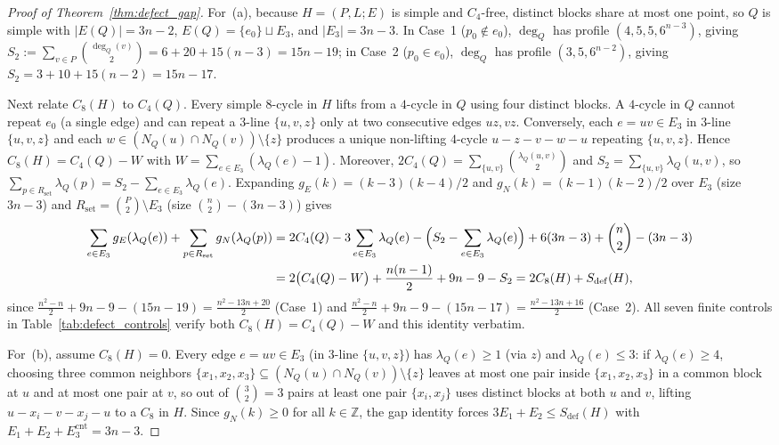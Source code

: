 \documentclass[11pt]{amsart}
\theoremstyle{definition}
\theoremstyle{remark}
\newcommand{\Z}{\mathbb{Z}}
\begin{document}
\begin{proof}[Proof of Theorem~\ref{thm:defect_gap}]
For~(a), because $H = (P, L; E)$ is simple and $C_4$-free, distinct blocks share at most one point, so $Q$ is simple with $|E(Q)| = 3n - 2$, $E(Q) = \{e_0\} \sqcup E_3$, and $|E_3| = 3n - 3$. In Case~1 ($p_0 \notin e_0$), $\deg_Q$ has profile $(4, 5, 5, 6^{n-3})$, giving $S_2 := \sum_{v \in P} \binom{\deg_Q(v)}{2} = 6 + 20 + 15(n-3) = 15n - 19$; in Case~2 ($p_0 \in e_0$), $\deg_Q$ has profile $(3, 5, 6^{n-2})$, giving $S_2 = 3 + 10 + 15(n-2) = 15n - 17$.

Next relate $C_8(H)$ to $C_4(Q)$. Every simple $8$-cycle in $H$ lifts from a $4$-cycle in $Q$ using four distinct blocks. A $4$-cycle in $Q$ cannot repeat $e_0$ (a single edge) and can repeat a $3$-line $\{u, v, z\}$ only at two consecutive edges $uz, vz$. Conversely, each $e = uv \in E_3$ in $3$-line $\{u, v, z\}$ and each $w \in (N_Q(u) \cap N_Q(v)) \setminus \{z\}$ produces a unique non-lifting $4$-cycle $u - z - v - w - u$ repeating $\{u, v, z\}$. Hence $C_8(H) = C_4(Q) - W$ with $W = \sum_{e \in E_3} (\lambda_Q(e) - 1)$. Moreover, $2 C_4(Q) = \sum_{\{u,v\}} \binom{\lambda_Q(u,v)}{2}$ and $S_2 = \sum_{\{u,v\}} \lambda_Q(u,v)$, so $\sum_{p \in R_{\mathrm{set}}} \lambda_Q(p) = S_2 - \sum_{e \in E_3} \lambda_Q(e)$. Expanding $g_E(k) = (k-3)(k-4)/2$ and $g_N(k) = (k-1)(k-2)/2$ over $E_3$ (size $3n-3$) and $R_{\mathrm{set}} = \binom{P}{2} \setminus E_3$ (size $\binom{n}{2} - (3n-3)$) gives
\begin{align*}
\sum_{e \in E_3} g_E(\lambda_Q(e)) + \sum_{p \in R_{\mathrm{set}}} g_N(\lambda_Q(p))
&= 2 C_4(Q) - 3\sum_{e \in E_3} \lambda_Q(e) - \Bigl(S_2 - \sum_{e \in E_3}\lambda_Q(e)\Bigr) + 6(3n-3) + \binom{n}{2} - (3n-3) \\
&= 2\bigl(C_4(Q) - W\bigr) + \frac{n(n-1)}{2} + 9n - 9 - S_2 = 2 C_8(H) + S_{\mathrm{def}}(H),
\end{align*}
since $\frac{n^2-n}{2} + 9n - 9 - (15n-19) = \frac{n^2-13n+20}{2}$ (Case~1) and $\frac{n^2-n}{2} + 9n - 9 - (15n-17) = \frac{n^2-13n+16}{2}$ (Case~2). All seven finite controls in Table~\ref{tab:defect_controls} verify both $C_8(H) = C_4(Q) - W$ and this identity verbatim.

For~(b), assume $C_8(H) = 0$. Every edge $e = uv \in E_3$ (in $3$-line $\{u, v, z\}$) has $\lambda_Q(e) \ge 1$ (via $z$) and $\lambda_Q(e) \le 3$: if $\lambda_Q(e) \ge 4$, choosing three common neighbors $\{x_1, x_2, x_3\} \subseteq (N_Q(u) \cap N_Q(v)) \setminus \{z\}$ leaves at most one pair inside $\{x_1, x_2, x_3\}$ in a common block at $u$ and at most one pair at $v$, so out of $\binom{3}{2} = 3$ pairs at least one pair $\{x_i, x_j\}$ uses distinct blocks at both $u$ and $v$, lifting $u - x_i - v - x_j - u$ to a $C_8$ in $H$. Since $g_N(k) \ge 0$ for all $k \in \Z$, the gap identity forces $3 E_1 + E_2 \le S_{\mathrm{def}}(H)$ with $E_1 + E_2 + E_3^{\mathrm{cnt}} = 3n - 3$.


\end{proof}
\end{document}
